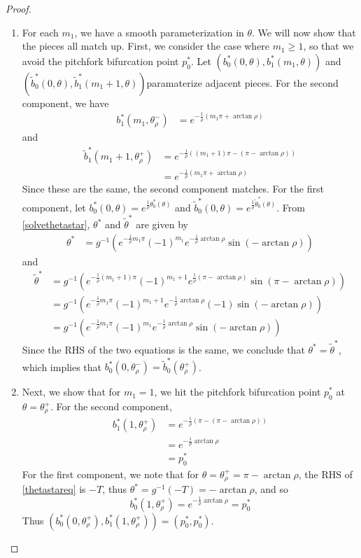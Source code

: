 \documentclass[thesis.tex]{subfiles}
\begin{document}
\begin{lemma}
\begin{proof}
\begin{enumerate}
	\item For each $m_1$, we have a smooth parameterization in $\theta$. We will now show that the pieces all match up. First, we consider the case where $m_1 \geq 1$, so that we avoid the pitchfork bifurcation point $p_0^*$. Let $(b^*_0(0, \theta), b^*_1(m_1, \theta))$ and $(\tilde{b}^*_0(0, \theta), \tilde{b}^*_1(m_1 + 1, \theta))$paramaterize adjacent pieces. For the second component, we have
	\begin{align*}
	b_1^*(m_1, \theta_\rho^-) &= e^{ -\frac{1}{\rho}(m_1 \pi + \arctan \rho) }
	\end{align*}
	and
	\begin{align*}
	\tilde{b}_1^*(m_1 + 1, \theta_\rho^+) 
	&= e^{ -\frac{1}{\rho}((m_1+1) \pi - (\pi - \arctan \rho)) } \\
	&= e^{ -\frac{1}{\rho}(m_1 \pi + \arctan \rho) }
	\end{align*}
	Since these are the same, the second component matches. For the first component, let $b_0^*(0, \theta) = e^{ \frac{1}{\rho} \theta_0^*(\theta) }$ and $\tilde{b}_0^*(0, \theta) = e^{ \frac{1}{\rho} \tilde{\theta}_0^*(\theta) }$. From \eqref{solvethetastar}, $\theta^*$ and $\tilde{\theta}^*$ are given by
	\begin{align*}
	\theta^* &= g^{-1}\left( e^{ -\frac{1}{\rho} m_1 \pi } (-1)^{m_1}  e^{ -\frac{1}{\rho} \arctan \rho } \sin(-\arctan \rho) \right)
	\end{align*}
	and
	\begin{align*}
	\tilde{\theta}^* &= g^{-1}\left( e^{ -\frac{1}{\rho} (m_1+1) \pi } (-1)^{m_1+1}  e^{ \frac{1}{\rho} (\pi - \arctan \rho) } \sin(\pi - \arctan \rho) \right) \\
	&= g^{-1}\left( e^{ -\frac{1}{\rho} m_1 \pi } (-1)^{m_1+1} e^{-\frac{1}{\rho} \arctan \rho } (-1) \sin(- \arctan \rho) \right) \\
	&= g^{-1}\left( e^{ -\frac{1}{\rho} m_1 \pi } (-1)^{m_1} e^{-\frac{1}{\rho} \arctan \rho } \sin(-\arctan \rho) \right)
	\end{align*}
	Since the RHS of the two equations is the same, we conclude that $\theta^* = \tilde{\theta}^*$, which implies that $b_0^*(0, \theta_\rho^-) = \tilde{b}_0^*(\theta_\rho^+)$.

	\item Next, we show that for $m_1 = 1$, we hit the pitchfork bifurcation point $p_0^*$ at $\theta = \theta_\rho^+$. For the second component, 
	\begin{align*}
	b_1^*(1, \theta_\rho^+) &= e^{-\frac{1}{\rho}(\pi - (\pi - \arctan \rho)) } \\
	&= e^{ -\frac{1}{\rho} \arctan \rho } \\
	&= p_0^*
	\end{align*}
	For the first component, we note that for $\theta = \theta_\rho^+ = \pi -\arctan \rho$, the RHS of \eqref{thetastareq} is $-T$, thus $\theta^* = g^{-1}(-T) = -\arctan \rho$, and so 
	\[
	b_0^*(1, \theta_\rho^+) = e^{ -\frac{1}{\rho} \arctan \rho } = p_0^*
	\]
	Thus $(b_0^*(0, \theta_\rho^+), b_1^*(1, \theta_\rho^+)) = (p_0^*,p_0^*).$


\end{enumerate}
\end{proof}
\end{lemma}
\end{document}
